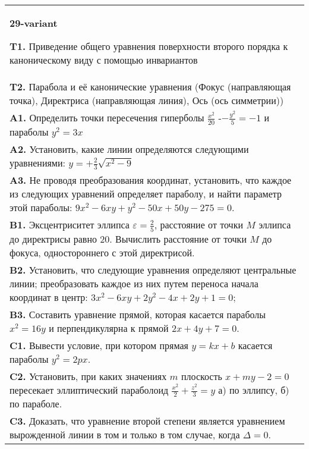 \documentclass{article}
\begin{document}
\begin{tabular}{m{17cm}}
\textbf{29-variant}
\newline

\textbf{T1.} Приведение общего уравнения поверхности второго порядка к каноническому виду с помощью инвариантов \\
\textbf{T2.} Парабола и её канонические уравнения (Фокус (направляющая точка), Директриса (направляющая линия), Ось (ось симметрии)) \\
\textbf{A1.} Определить точки пересечения гиперболы $\frac{x^2}{20}$ -$-\frac{y^2}{5}=-1$ и параболы $y^2=3 x$ \\
\textbf{A2.} Установить, какие линии определяются следующими уравнениями: $y=+\frac{2}{3} \sqrt{x^2-9}$ \\
\textbf{A3.} Не проводя преобразования координат, установить, что каждое из следующих уравнений определяет параболу, и найти параметр этой параболы: $9 x^2-6 x y+y^2-50 x+50 y-275=0$. \\
\textbf{B1.} Эксцентриситет эллипса $\varepsilon=\frac{2}{5}$, расстояние от точки $M$ эллипса до директрисы равно 20. Вычислить расстояние от точки $M$ до фокуса, одностороннего с этой директрисой. \\
\textbf{B2.} Установить, что следующие уравнения определяют центральные линии; преобразовать каждое из них путем переноса начала координат в центр: $3 x^2-6 x y+2 y^2-4 x+2 y+1=0$; \\
\textbf{B3.} Составить уравнение прямой, которая касается параболы $x^2=16 y$ и перпендикулярна к прямой $2 x+4 y+7=0$. \\
\textbf{C1.} Вывести условие, при котором прямая $y=k x+b$ касается параболы $y^2=2 p x$. \\
\textbf{C2.} Установить, при каких значениях $m$ плоскость $x+m y-2=0$ пересекает эллиптический параболоид $\frac{x^2}{2}+\frac{z^2}{3}=y$ а) по эллипсу, б) по параболе. \\
\textbf{C3.} Доказать, что уравнение второй степени является уравнением вырожденной линии в том и только в том случае, когда $\Delta=0$. \\

\end{tabular}
\vspace{1cm}
\end{document}
